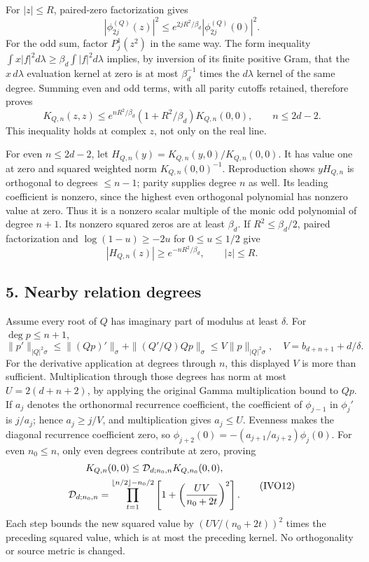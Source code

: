 \documentclass[11pt]{article}
\begin{document}
For \(|z|\le R\), paired-zero factorization gives \[
|\phi_{2j}^{(Q)}(z)|^2
\le e^{2jR^2/\beta_d}|\phi_{2j}^{(Q)}(0)|^2.
\] For the odd sum, factor \(P_j^1(z^2)\) in the same way. The form inequality \(\int x|f|^2d\lambda\ge\beta_d\int|f|^2d\lambda\) implies, by inversion of its finite positive Gram, that the \(x\,d\lambda\) evaluation kernel at zero is at most \(\beta_d^{-1}\) times the \(d\lambda\) kernel of the same degree. Summing even and odd terms, with all parity cutoffs retained, therefore proves \[
K_{Q,n}(z,z)\le e^{nR^2/\beta_d}
(1+R^2/\beta_d)K_{Q,n}(0,0),\qquad n\le2d-2.
\tag{IVO10}
\] This inequality holds at complex \(z\), not only on the real line.

For even \(n\le2d-2\), let \(H_{Q,n}(y)=K_{Q,n}(y,0)/K_{Q,n}(0,0)\). It has value one at zero and squared weighted norm \(K_{Q,n}(0,0)^{-1}\). Reproduction shows \(yH_{Q,n}\) is orthogonal to degrees \(\le n-1\); parity supplies degree \(n\) as well. Its leading coefficient is nonzero, since the highest even orthogonal polynomial has nonzero value at zero. Thus it is a nonzero scalar multiple of the monic odd polynomial of degree \(n+1\). Its nonzero squared zeros are at least \(\beta_d\). If \(R^2\le\beta_d/2\), paired factorization and \(\log(1-u)\ge-2u\) for \(0\le u\le1/2\) give \[
|H_{Q,n}(z)|\ge e^{-nR^2/\beta_d},\qquad |z|\le R.
\tag{IVO11}
\]

\subsection{5. Nearby relation degrees}\label{nearby-relation-degrees}

Assume every root of \(Q\) has imaginary part of modulus at least \(\delta\). For \(\deg p\le n+1\), \[
\|p'\|_{|Q|^2\sigma}
\le\|(Qp)'\|_\sigma+\|(Q'/Q)Qp\|_\sigma
\le V\|p\|_{|Q|^2\sigma},\quad
V=b_{d+n+1}+d/\delta.
\] For the derivative application at degrees through \(n\), this displayed \(V\) is more than sufficient. Multiplication through those degrees has norm at most \(U=2(d+n+2)\), by applying the original Gamma multiplication bound to \(Qp\). If \(a_j\) denotes the orthonormal recurrence coefficient, the coefficient of \(\phi_{j-1}\) in \(\phi_j'\) is \(j/a_j\); hence \(a_j\ge j/V\), and multiplication gives \(a_j\le U\). Evenness makes the diagonal recurrence coefficient zero, so \(\phi_{j+2}(0)=-(a_{j+1}/a_{j+2})\phi_j(0)\). For even \(n_0\le n\), only even degrees contribute at zero, proving \[
\begin{gathered}
K_{Q,n}(0,0)\le{\cal D}_{d;n_0,n}K_{Q,n_0}(0,0),\\
{\cal D}_{d;n_0,n}=
\prod_{t=1}^{\lfloor n/2\rfloor-n_0/2}
\left[1+\left(\frac{UV}{n_0+2t}\right)^2\right].
\end{gathered}\tag{IVO12}
\] Each step bounds the new squared value by \((UV/(n_0+2t))^2\) times the preceding squared value, which is at most the preceding kernel. No orthogonality or source metric is changed.
\end{document}
